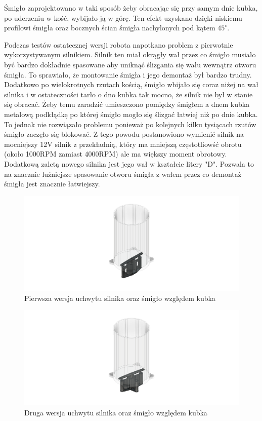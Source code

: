 Śmigło zaprojektowano w taki sposób żeby obracając się przy samym dnie kubka, po uderzeniu w kość, wybijało ją w górę. Ten efekt uzyskano
dzięki niskiemu profilowi śmigła oraz bocznych ścian śmigła nachylonych pod kątem $45^{\circ}$.

Podczas testów ostatecznej wersji robota napotkano problem z pierwotnie wykorzystywanym silnikiem. Silnik ten miał okrągły wał przez co śmigło musiało
być bardzo dokładnie spasowane aby uniknąć ślizgania się wału wewnątrz otworu śmigła. To sprawiało, że montowanie śmigła i jego demontaż był bardzo trudny. Dodatkowo po wielokrotnych rzutach kością, śmigło
wbijało się coraz niżej na wał silnika i w ostateczności tarło o dno kubka tak mocno, że silnik nie był w stanie się obracać. 
Żeby temu zaradzić umieszczono pomiędzy śmigłem a dnem kubka metalową podkłądkę po której śmigło mogło się ślizgać łatwiej niż po dnie kubka. To
jednak nie rozwiązało problemu ponieważ po kolejnych kilku tysiącach rzutów śmigło zaczęło się blokować. 
Z tego powodu postanowiono wymienić silnik na mocniejszy 12V silnik z przekładnią, który ma mniejszą częstotliowść obrotu (około 1000RPM zamiast 4000RPM) ale ma większy moment obrotowy.
Dodatkową zaletą nowego silnika jest jego wał w kształcie litery "D". Pozwala to na znacznie luźniejsze spasowanie otworu śmigła z wałem przez co 
demontaż śmigła jest znacznie łatwiejszy.

\begin{figure}[H]
    \centering
    \includegraphics[width=0.95\linewidth]{chapters/03-praca-wlasna/figures/uchwyt_v1.png}
    \caption{\label{fig:uchwyt_v1}Pierwsza wersja uchwytu silnika oraz śmigło względem kubka}
\end{figure}

\begin{figure}[H]
    \centering
    \includegraphics[width=0.95\linewidth]{chapters/03-praca-wlasna/figures/uchwyt_v2.png}
    \caption{\label{fig:uchwyt}Druga wersja uchwytu silnika oraz śmigło względem kubka}
\end{figure}

